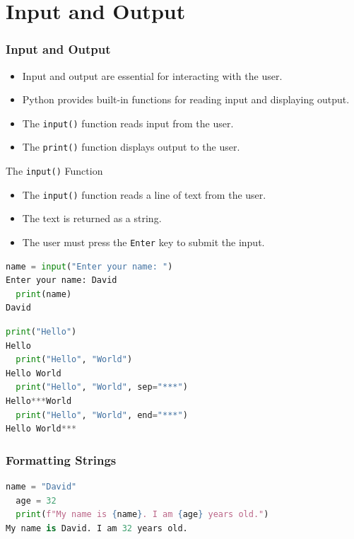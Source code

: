 \section{Input and Output}
\begin{frame}
    \frametitle{Input and Output}
    \begin{itemize}
        \item Input and output are essential for interacting with the user.
        \item Python provides built-in functions for reading input and displaying output.
        \item The \texttt{input()} function reads input from the user.
        \item The \texttt{print()} function displays output to the user.
    \end{itemize}
\end{frame} 

\begin{frame}[fragile]{The \texttt{input()} Function}
    \begin{itemize}
        \item The \texttt{input()} function reads a line of text from the user.
        \item The text is returned as a string.
        \item The user must press the \texttt{Enter} key to submit the input.
    \end{itemize}
    \begin{lstlisting}[language=Python]
  name = input("Enter your name: ")
Enter your name: David
  print(name)
David
    \end{lstlisting}    
\end{frame}

\begin{frame}[fragile]{}
    \begin{lstlisting}[language=Python]
  print("Hello")
Hello
  print("Hello", "World")
Hello World
  print("Hello", "World", sep="***")
Hello***World
  print("Hello", "World", end="***")
Hello World***
    \end{lstlisting}
\end{frame}

\begin{frame}[fragile]
    \frametitle{Formatting Strings}
    \begin{lstlisting}[language=Python]
  name = "David"
  age = 32
  print(f"My name is {name}. I am {age} years old.")
My name is David. I am 32 years old.    
    \end{lstlisting}  
\end{frame}


